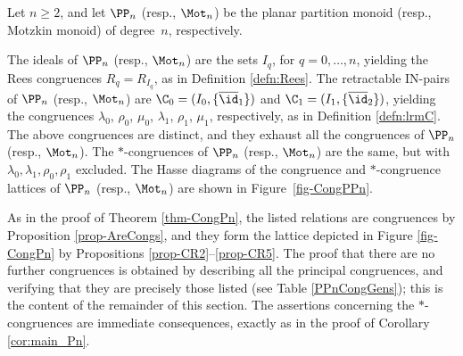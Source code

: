 \newpage

\begin{thm}\label{thm-CongPPn}
Let $n\geq2$, and let $\PP_n$ (resp., $\Mot_n$) be the planar partition monoid (resp., Motzkin monoid) of degree~$n$, respectively.  
\begin{itemize}
 The ideals of $\PP_n$ (resp., $\Mot_n$) are the sets $I_q$, for $q=0,\ldots,n$, yielding the Rees congruences $R_q=R_{I_q}$, as in Definition \ref{defn:Rees}.
 The retractable IN-pairs of $\PP_n$ (resp., $\Mot_n$) are $\C_0=(I_0,\{\overline{\id}_1\})$ and $\C_1=(I_1,\{\overline{\id}_2\})$, yielding the congruences $\lambda_0$, $\rho_0$, $\mu_0$, $\lambda_1$, $\rho_1$, $\mu_1$, respectively, as in Definition \ref{defn:lrmC}.
 The above congruences are distinct, and they exhaust all the congruences of $\PP_n$ (resp., $\Mot_n$).
 The $\ast$-congruences of $\PP_n$ (resp., $\Mot_n$) are the same, but with $\lambda_0,\lambda_1,\rho_0,\rho_1$ excluded.
 The Hasse diagrams of the congruence and $*$-congruence lattices of $\PP_n$ (resp., $\Mot_n$) are shown in Figure~\ref{fig-CongPPn}.
\end{itemize}
\end{thm}

\pf
As in the proof of Theorem \ref{thm-CongPn}, the
listed relations are congruences by Proposition \ref{prop-AreCongs}, and they form the lattice depicted in Figure \ref{fig-CongPn} by Propositions \ref{prop-CR2}--\ref{prop-CR5}.
The proof that there are no further congruences is obtained by describing all the principal congruences, and verifying that they are precisely those listed (see Table \ref{PPnCongGens}); 
this is the content of the remainder of this section. 
The assertions concerning the $\ast$-congruences are immediate consequences, exactly as in the proof of Corollary \ref{cor:main_Pn}.
\epf



